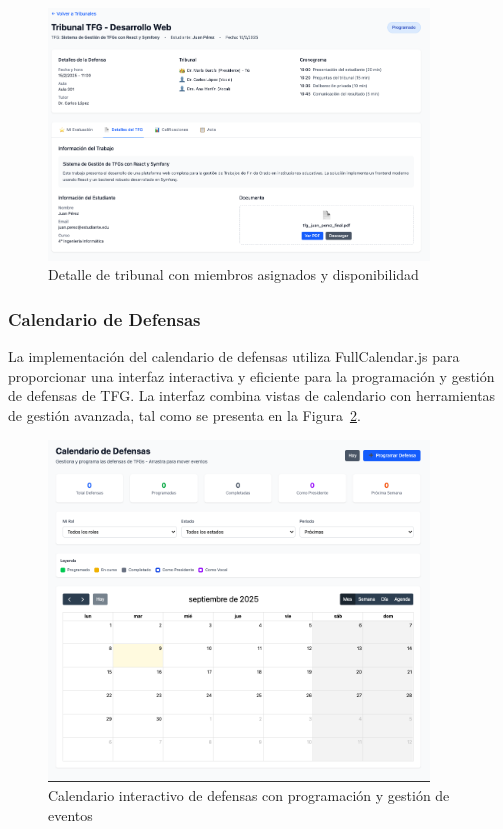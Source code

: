 \documentclass[12pt,a4paper,oneside]{report}
\begin{document}
\begin{figure}[H]
\centering
\includegraphics[width=0.9\textwidth]{processed/images/detalle_tribunales.png}
\caption{Detalle de tribunal con miembros asignados y disponibilidad}
\label{fig:detalle-tribunales}
\end{figure}

\subsubsection{Calendario de Defensas}\label{calendario-de-defensas}

La implementación del calendario de defensas utiliza FullCalendar.js para proporcionar una interfaz interactiva y eficiente para la programación y gestión de defensas de TFG. La interfaz combina vistas de calendario con herramientas de gestión avanzada, tal como se presenta en la Figura~\ref{fig:calendario-defensas}.

\begin{figure}[H]
\centering
\includegraphics[width=0.9\textwidth]{processed/images/calendario_defensas.png}
\caption{Calendario interactivo de defensas con programación y gestión de eventos}
\label{fig:calendario-defensas}
\end{figure}
\end{document}

